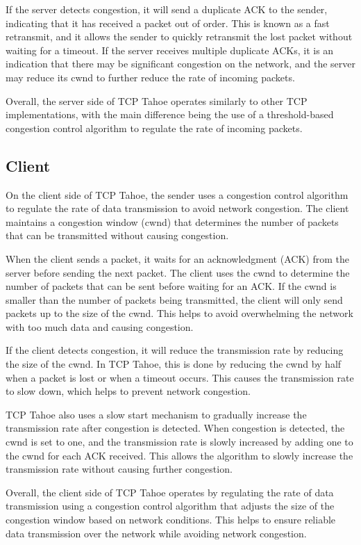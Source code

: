 \documentclass[11pt]{article}
\begin{document}
If the server detects congestion, it will send a duplicate ACK to the sender, indicating that it has received a packet out of order. This is known as a fast retransmit, and it allows the sender to quickly retransmit the lost packet without waiting for a timeout. If the server receives multiple duplicate ACKs, it is an indication that there may be significant congestion on the network, and the server may reduce its cwnd to further reduce the rate of incoming packets.

Overall, the server side of TCP Tahoe operates similarly to other TCP implementations, with the main difference being the use of a threshold-based congestion control algorithm to regulate the rate of incoming packets.

\subsection{Client}
On the client side of TCP Tahoe, the sender uses a congestion control algorithm to regulate the rate of data transmission to avoid network congestion. The client maintains a congestion window (cwnd) that determines the number of packets that can be transmitted without causing congestion.

When the client sends a packet, it waits for an acknowledgment (ACK) from the server before sending the next packet. The client uses the cwnd to determine the number of packets that can be sent before waiting for an ACK. If the cwnd is smaller than the number of packets being transmitted, the client will only send packets up to the size of the cwnd. This helps to avoid overwhelming the network with too much data and causing congestion.

If the client detects congestion, it will reduce the transmission rate by reducing the size of the cwnd. In TCP Tahoe, this is done by reducing the cwnd by half when a packet is lost or when a timeout occurs. This causes the transmission rate to slow down, which helps to prevent network congestion.

TCP Tahoe also uses a slow start mechanism to gradually increase the transmission rate after congestion is detected. When congestion is detected, the cwnd is set to one, and the transmission rate is slowly increased by adding one to the cwnd for each ACK received. This allows the algorithm to slowly increase the transmission rate without causing further congestion.

Overall, the client side of TCP Tahoe operates by regulating the rate of data transmission using a congestion control algorithm that adjusts the size of the congestion window based on network conditions. This helps to ensure reliable data transmission over the network while avoiding network congestion.
\end{document}
